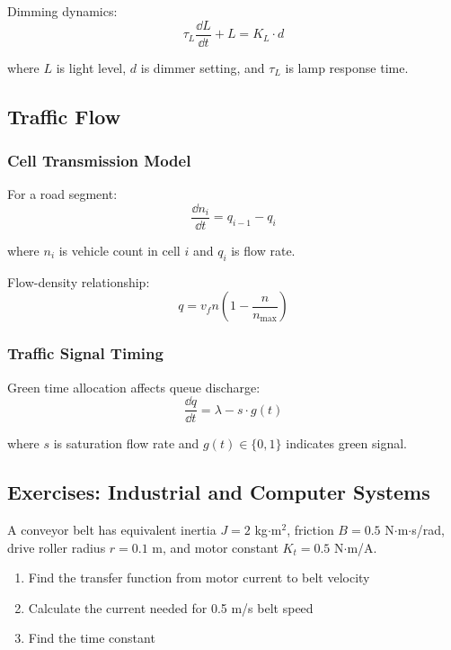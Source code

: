 Dimming dynamics:
\begin{equation}
\tau_L\frac{\dd L}{\dd t} + L = K_L \cdot d
\end{equation}

where $L$ is light level, $d$ is dimmer setting, and $\tau_L$ is lamp response time.

\subsection{Traffic Flow}
\label{subsec:traffic}

\subsubsection{Cell Transmission Model}

For a road segment:
\begin{equation}
\frac{\dd n_i}{\dd t} = q_{i-1} - q_i
\end{equation}

where $n_i$ is vehicle count in cell $i$ and $q_i$ is flow rate.

Flow-density relationship:
\begin{equation}
q = v_f n \left(1 - \frac{n}{n_{\max}}\right)
\end{equation}

\subsubsection{Traffic Signal Timing}

Green time allocation affects queue discharge:
\begin{equation}
\frac{\dd q}{\dd t} = \lambda - s \cdot g(t)
\end{equation}

where $s$ is saturation flow rate and $g(t) \in \{0, 1\}$ indicates green signal.

\subsection{Exercises: Industrial and Computer Systems}

\begin{exercise}
A conveyor belt has equivalent inertia $J = 2$ kg$\cdot$m$^2$, friction $B = 0.5$ N$\cdot$m$\cdot$s/rad, drive roller radius $r = 0.1$ m, and motor constant $K_t = 0.5$ N$\cdot$m/A.
\begin{enumerate}[label=(\alph*)]
    \item Find the transfer function from motor current to belt velocity
    \item Calculate the current needed for 0.5 m/s belt speed
    \item Find the time constant
\end{enumerate}
\end{exercise}

